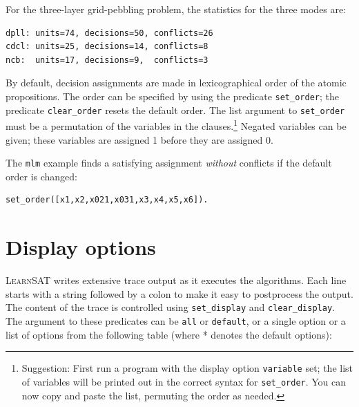 \documentclass[11pt]{article}
\newcommand*{\p}[1]{\textup{\texttt{#1}}}
\newcommand*{\ls}{\textsc{LearnSAT}}
\begin{document}
For the three-layer grid-pebbling problem, the statistics for the three
modes are:
\begin{verbatim}
dpll: units=74, decisions=50, conflicts=26
cdcl: units=25, decisions=14, conflicts=8
ncb:  units=17, decisions=9,  conflicts=3
\end{verbatim}


By default, decision assignments are made in lexicographical order of
the atomic propositions. The order can be specified by using the
predicate \p{set\_order}; the predicate \p{clear\_order} resets the
default order. The list argument to \p{set\_order} must be a permutation
of the variables in the clauses.\footnote{Suggestion: First run a
program with the display option \p{variable} set; the list of variables
will be printed out in the correct syntax for \p{set\_order}. You can
now copy and paste the list, permuting the order as needed.} Negated
variables can be given; these variables are assigned 1 before they are
assigned 0.

The \p{mlm} example finds a satisfying assignment \emph{without}
conflicts if the default order is changed:

\begin{verbatim}
set_order([x1,x2,x021,x031,x3,x4,x5,x6]).
\end{verbatim}

\newpage

\section{Display options}

\ls{} writes extensive trace output as it executes the algorithms. Each
line starts with a string followed by a colon to make it easy to
postprocess the output. The content of the trace is controlled using
\p{set\_display} and \p{clear\_display}. The argument to these
predicates can be \p{all} or \p{default}, or a single option or a list
of options from the following table (where * denotes the default
options):
\end{document}
